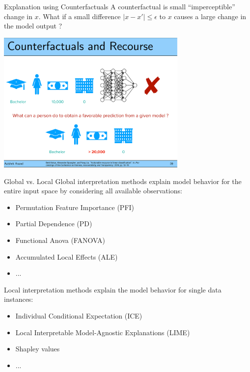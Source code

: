 \documentclass[11pt,compress,t,notes=noshow, aspectratio=169, xcolor=table]{beamer}
\begin{document}
\begin{frame}{Explanation using Counterfactuals}
    A counterfactual is small ``imperceptible'' change in $x$. What if a small difference $ |x - x'| \leq \epsilon$ to $x$ causes a large change in the model output ?
	\begin{center}
	\includegraphics[page=1, width=0.7\textwidth]{figure/counterfactual.pdf}
	\end{center}

\end{frame}


\begin{frame}{Global vs. Local}
Global interpretation methods explain model behavior for the entire input space by considering all available observations:
	\begin{itemize}
		\item Permutation Feature Importance (PFI)
		\item Partial Dependence (PD)
		\item Functional Anova (FANOVA)
		\item Accumulated Local Effects (ALE)
		\item ...
	\end{itemize}
\bigskip
Local interpretation methods explain the model behavior for single data instances:
	\begin{itemize}
		\item Individual Conditional Expectation (ICE)
		\item Local Interpretable Model-Agnostic Explanations (LIME)
		\item Shapley values
		\item ...
	\end{itemize}
\end{frame}
\end{document}
